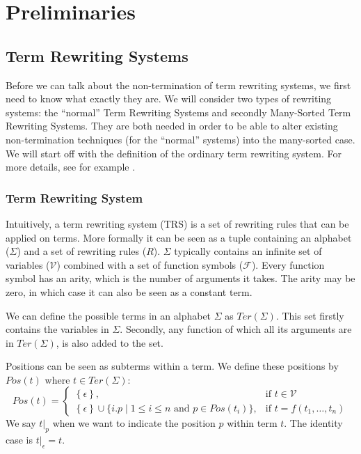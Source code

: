 \chapter{Preliminaries}\label{preliminaries}
\section{Term Rewriting Systems}
Before we can talk about the non-termination of term rewriting systems, we first need to know what exactly they are. We will consider two types of rewriting systems: the ``normal'' Term Rewriting Systems and secondly Many-Sorted Term Rewriting Systems. They are both needed in order to be able to alter existing non-termination techniques (for the ``normal'' systems) into the many-sorted case. We will start off with the definition of the ordinary term rewriting system. For more details, see for example \cite{Klop:1993:TRS:162552.162559}.
\subsection{Term Rewriting System}
Intuitively, a term rewriting system (TRS) is a set of rewriting rules that can be applied on terms. More formally it can be seen as a tuple containing an alphabet ($\Sigma$) and a set of rewriting rules ($R$). $\Sigma$ typically contains an infinite set of variables ($\mathcal{V}$) combined with a set of function symbols ($\mathcal{F}$). Every function symbol has an arity, which is the number of arguments it takes. The arity may be zero, in which case it can also be seen as a constant term.  

We can define the possible terms in an alphabet $\Sigma$ as $\textit{Ter}\left(\Sigma\right)$. This set firstly contains the variables in $\Sigma$. Secondly, any function of which all its arguments are in $\textit{Ter}\left(\Sigma\right)$, is also added to the set.

Positions can be seen as subterms within a term. We define these positions by $\textit{Pos}\left(t\right)$ where $t \in \textit{Ter}\left(\Sigma\right)$:
$$
\textit{Pos}(t) = \left\{\begin{array}{ll}
        \left\{\epsilon\right\}, & \text{if } t \in \mathcal{V}\\
        \left\{\epsilon\right\} \cup \{i.p \mid 1 \leq i \leq n \text{ and } p  \in \textit{Pos}(t_i)\} , & \text{if } t = f(t_1, \dots, t_n)
        \end{array}\right.
$$
We say $\left.t\right|_p$ when we want to indicate the position $p$ within term $t$. The identity case is $\left.t\right|_\epsilon = t$.

